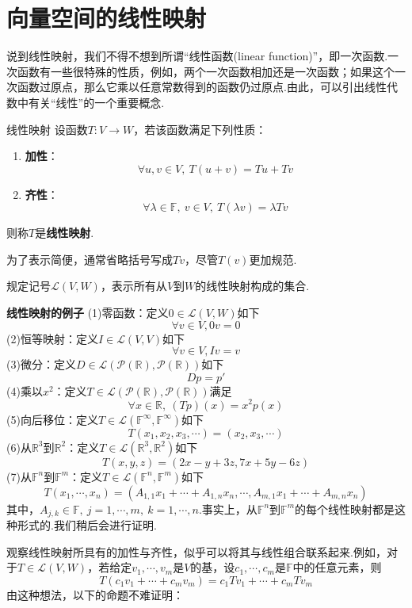 \documentclass[lang=cn, zihao=5]{elegantbook}
\newcommand{\R}{\mathbb{R}}
\newcommand{\F}{\mathbb{F}}
\newcommand{\lmap}{\mathcal{L}}
\newcommand{\examplefont}[1]{\color{mgreen} \textbf{#1}}
\begin{document}
\section{向量空间的线性映射}

说到线性映射，我们不得不想到所谓“线性函数(linear function)”，即一次函数.一次函数有一些很特殊的性质，例如，两个一次函数相加还是一次函数；如果这个一次函数过原点，那么它乘以任意常数得到的函数仍过原点.由此，可以引出线性代数中有关“线性”的一个重要概念.

\begin{definition}{线性映射}
	设函数$T:V \to W$，若该函数满足下列性质：
	\begin{enumerate}
		\item \textbf{加性}：$$\forall u,v \in V,~T(u+v)=Tu+Tv$$
		\item \textbf{齐性}：$$\forall \lambda \in \F,~v \in V,~T(\lambda v)=\lambda Tv$$
	\end{enumerate}
	则称$T$是\textbf{线性映射}.
\end{definition}
\begin{remark}
	为了表示简便，通常省略括号写成$Tv$，尽管$T(v)$更加规范.
\end{remark}

规定记号$\lmap (V,W)$，表示所有从$V$到$W$的线性映射构成的集合.

\begin{example}{\examplefont{线性映射的例子}}
	(1)零函数：定义$0 \in \lmap (V,W)$如下$$\forall v \in V, 0v=0$$
	(2)恒等映射：定义$I \in \lmap (V,V)$如下$$\forall v \in V, Iv=v$$
	(3)微分：定义$D \in \lmap (\mathcal{P}(\R),\mathcal{P}(\R))$如下$$Dp=p'$$
	(4)乘以$x^2$：定义$T \in \lmap (\mathcal{P}(\R),\mathcal{P}(\R))$满足$$\forall x \in \R ,~(Tp)(x)=x^2p(x)$$
	(5)向后移位：定义$T \in \lmap (\F ^{\infty},\F ^{\infty})$如下$$T(x_1,x_2,x_3, \cdots ) = (x_2,x_3, \cdots)$$
	(6)从$\R ^3$到$\R ^2$：定义$T \in \lmap (\R ^{3},\R ^{2})$如下$$T(x,y,z)=(2x-y+3z,7x+5y-6z)$$
	(7)从$\F ^n$到$\F ^m$：定义$T \in \lmap (\F ^{n},\F ^{m})$如下$$T(x_1,\cdots ,x_n) = (A_{1,1}x_1 + \cdots + A_{1,n}x_n, \cdots , A_{m,1}x_1+\cdots +A_{m,n}x_n)$$
	其中，$A_{j,k} \in \F ,~j=1, \cdots ,m,~ k = 1, \cdots ,n$.事实上，从$\F ^n$到$\F ^m$的每个线性映射都是这种形式的.我们稍后会进行证明.
\end{example}

观察线性映射所具有的加性与齐性，似乎可以将其与线性组合联系起来.例如，对于$T \in \lmap (V,W)$，若给定$v_1, \cdots ,v_m$是$V$的基，设$c_1, \cdots ,c_m$是$\F$中的任意元素，则$$T(c_1v_1 + \cdots + c_mv_m) = c_1Tv_1 + \cdots + c_mTv_m$$
由这种想法，以下的命题不难证明：
\end{document}
